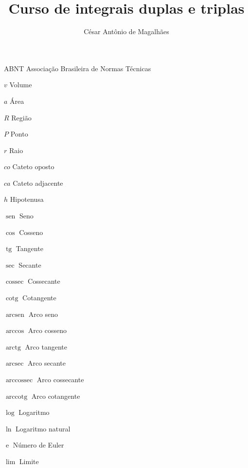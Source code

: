 \documentclass[
	12pt,				%
	openright,			%
	twoside,			%
	a4paper,			%
	english,			%
	french,				%
	spanish,			%
	brazil,				%
]{abntex2}
\title{Curso de integrais duplas e triplas}
\author{César Antônio de Magalhães}
\DeclareMathOperator{\sen}{sen}
\DeclareMathOperator{\tg}{tg}
\DeclareMathOperator{\cossec}{cossec}
\DeclareMathOperator{\cotg}{cotg}
\DeclareMathOperator{\arcsen}{arcsen}
\DeclareMathOperator{\arctg}{arctg}
\DeclareMathOperator{\arcsec}{arcsec}
\DeclareMathOperator{\arccossec}{arccossec}
\DeclareMathOperator{\arccotg}{arccotg}
\DeclareMathOperator{\e}{e}
\begin{document}

\frenchspacing 


\imprimircapa

\imprimirfolhaderosto


\listoffigures*
\cleardoublepage

\listoftables*
\cleardoublepage

\begin{siglas}
	\item[ABNT] Associação Brasileira de Normas Técnicas
	\item[$v$] Volume
	\item[$a$] Área
	\item[$R$] Região
	\item[$P$] Ponto
	\item[$r$] Raio
	\item[$co$] Cateto oposto
	\item[$ca$] Cateto adjacente
	\item[$h$] Hipotenusa
	\item[$\sen$] Seno
	\item[$\cos$] Cosseno
	\item[$\tg$] Tangente
	\item[$\sec$] Secante
	\item[$\cossec$] Cossecante
	\item[$\cotg$] Cotangente
	\item[$\arcsen$] Arco seno
	\item[$\arccos$] Arco cosseno
	\item[$\arctg$] Arco tangente
	\item[$\arcsec$] Arco secante
	\item[$\arccossec$] Arco cossecante
	\item[$\arccotg$] Arco cotangente
	\item[$\log$] Logaritmo
	\item[$\ln$] Logaritmo natural
	\item[$\e$] Número de Euler
	\item[$\lim$] Limite	
\end{siglas}
\end{document}
